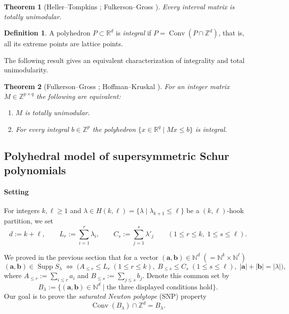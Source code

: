 \documentclass[12pt,a4paper,oneside]{amsart}
\newtheorem{theorem}{Theorem}[section]
\theoremstyle{definition}
\newtheorem{definition}{Definition}[section]
\DeclareMathOperator{\Supp}{Supp}
\DeclareMathOperator{\Conv}{Conv}
\newcommand{\N}{\mathbb{N}}
\newcommand{\Z}{\mathbb{Z}}
\newcommand{\R}{\mathbb{R}}
\begin{document}
\begin{theorem}[Heller–Tompkins \cite{HT56};
Fulkerson–Gross \cite{FG65}]
\label{thm:C1_TU}
Every interval matrix is totally unimodular.
\end{theorem}


\begin{definition}
A polyhedron $P\subset\R^{d}$ is \emph{integral} if $P=\operatorname{Conv}(P\cap\Z^{d})$, that is, all its extreme points are lattice points.
\end{definition}

The following result gives an equivalent characterization of integrality and total unimodularity. 
\begin{theorem}[Fulkerson–Gross \cite{FG65}; Hoffman–Kruskal \cite{HK10}]
\label{thm:HK}
For an integer matrix $M\in\Z^{p\times q}$ the following are equivalent:
\begin{enumerate}
\item $M$ is totally unimodular.
\item For every integral $b\in\Z^{p}$ the polyhedron
      $\{x\in\R^{q}\mid Mx\le b\}$ is integral.
\end{enumerate}
\end{theorem}

\subsection{Polyhedral model of supersymmetric Schur polynomials}\label{subsec:poly-model}

\paragraph{\textbf{Setting}}
For integers $k,\ell\ge1$ and $\lambda\in H(k,\ell)=\{\lambda\mid\lambda_{k+1}\le\ell\}$ be a $(k,\ell)$-hook partition, we set
\[
  d:=k+\ell,\qquad
  L_r:=\sum_{i=1}^{r}\lambda_i, \qquad
C_s:=\sum_{j=1}^{s}\lambda'_j
   \qquad(1\le r\le k,\;1\le s\le\ell).
\]

We proved in the previous section that for a vector
$(\mathbf a,\mathbf b)\in\N^{d}\;(=\N^{k}\times\N^{\ell})$
\[
  (\mathbf a,\mathbf b)\in\Supp S_\lambda
  \;\Longleftrightarrow\;
  \bigl(A_{\le r}\le L_r\;(1\le r\le k),\;
        B_{\le s}\le C_s\;(1\le s\le\ell),\;
        |\mathbf a|+|\mathbf b|=|\lambda|\bigr),
\]
where $A_{\le r}:=\sum_{i\le r}a_i$ and $B_{\le s}:=\sum_{j\le s}b_j$. Denote this common set by
\[
   B_\lambda
      :=\{(\mathbf a,\mathbf b)\in\N^{d}\mid
              \text{the three displayed conditions hold}\}.
\]
Our goal is to prove the \emph{saturated Newton polytope} (SNP) property
\begin{equation}\label{eq:SNP}
   \Conv(B_\lambda)\cap\Z^{d}=B_\lambda .
\end{equation}
\end{document}
